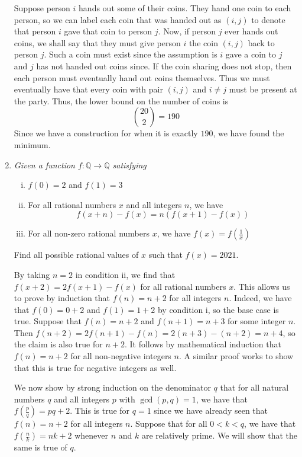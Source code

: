 \documentclass{article}
\begin{document}
\begin{enumerate}[1.]
Suppose person $i$ hands out some of their coins. They hand one coin to each person, so we can label each coin that was handed out as $(i, j)$ to denote that person $i$ gave that coin to person $j$. Now, if person $j$ ever hands out coins, we shall say that they must give person $i$ the coin $(i, j)$ back to person $j$. Such a coin must exist since the assumption is $i$ gave a coin to $j$ and $j$ has not handed out coins since. If the coin sharing does not stop, then each person must eventually hand out coins themselves. Thus we must eventually have that every coin with pair $(i, j)$ and $i \ne j$ must be present at the party. Thus, the lower bound on the number of coins is 
$$\binom{20}{2} = 190$$
Since we have a construction for when it is exactly $190$, we have found the minimum.

\item %
{\itshape Given a function $f: \mathbb{Q} \rightarrow \mathbb{Q}$ satisfying
\begin{enumerate}[i)]
  \item $f(0) = 2$ and $f(1) = 3$
  \item For all rational numbers $x$ and all integers $n$, we have 
  $$f(x + n) - f(x) = n(f(x + 1) - f(x)) $$
  \item For all non-zero rational numbers $x$, we have $f(x) = f(\frac{1}{x})$
\end{enumerate}
Find all possible rational values of $x$ such that $f(x) = 2021$.}

By taking $n = 2$ in condition ii, we find that $f(x + 2) = 2f(x + 1) - f(x)$ for all rational numbers $x$. This allows us to prove by induction that $f(n) = n + 2$ for all integers $n$. Indeed, we have that $f(0) = 0 + 2$ and $f(1) = 1 + 2$ by condition i, so the base case is true. Suppose that $f(n) = n + 2$ and $f(n + 1) = n + 3$ for some integer $n$. Then $f(n + 2) = 2f(n + 1) - f(n) = 2(n + 3) - (n + 2) = n + 4$, so the claim is also true for $n + 2$. It follows by mathematical induction that $f(n) = n + 2$ for all non-negative integers $n$. A similar proof works to show that this is true for negative integers as well.

We now show by strong induction on the denominator $q$ that for all natural numbers $q$ and all integers $p$ with $\gcd(p, q) = 1$, we have that $f\left(\frac{p}{q}\right) = pq + 2$. This is true for $q = 1$ since we have already seen that $f(n) = n + 2$ for all integers $n$. Suppose that for all $0 < k < q$, we have that $f\left(\frac{n}{k}\right) = nk + 2$ whenever $n$ and $k$ are relatively prime. We will show that the same is true of $q$.


\end{enumerate}
\end{document}
